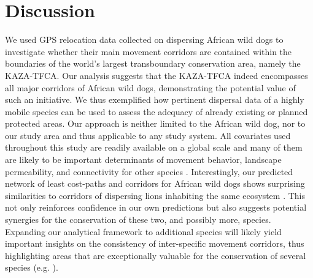 \documentclass[abstract=on,10pt,a4paper,bibliography=totocnumbered]{article}
\begin{document}
\section{Discussion}
We used GPS relocation data collected on dispersing African wild dogs to
investigate whether their main movement corridors are contained within the
boundaries of the world's largest transboundary conservation area, namely the
KAZA-TFCA. Our analysis suggests that the KAZA-TFCA indeed encompasses all major
corridors of African wild dogs, demonstrating the potential value of such an
initiative. We thus exemplified how pertinent dispersal data of a highly mobile
species can be used to assess the adequacy of already existing or planned
protected areas. Our approach is neither limited to the African wild dog, nor to
our study area and thus applicable to any study system. All covariates used
throughout this study are readily available on a global scale and many of them
are likely to be important determinants of movement behavior, landscape
permeability, and connectivity for other species \citep{Zeller.2012,
Thurfjell.2014}. Interestingly, our predicted network of least cost-paths and
corridors for African wild dogs shows surprising similarities to corridors of
dispersing lions inhabiting the same ecosystem \citep{Elliot.2014,
Cushman.2018}. This not only reinforces confidence in our own predictions but
also suggests potential synergies for the conservation of these two, and
possibly more, species. Expanding our analytical framework to additional species
will likely yield important insights on the consistency of inter-specific
movement corridors, thus highlighting areas that are exceptionally valuable for
the conservation of several species (e.g. \citealp{Brennan.2020}).
\end{document}
